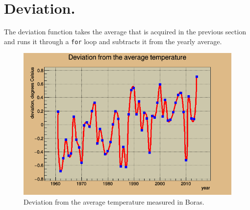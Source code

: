 \section*{Deviation.}
The deviation function takes the average that is acquired in the previous section and runs it through a \texttt{for} loop and subtracts it from the yearly average.

\begin{figure}[H]
	\centering
	\includegraphics[width=0.8 \textwidth]{boras_div.png}
	\caption{Deviation from the average temperature measured in Boras.}
\end{figure}